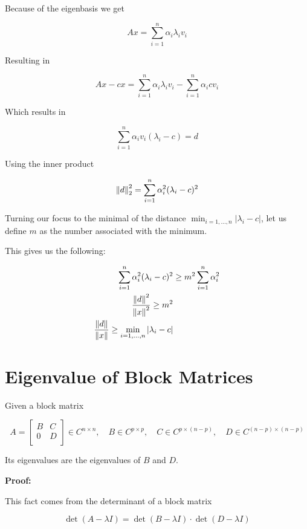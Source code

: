 Because of the eigenbasis we get 

\[
    Ax = \sum_{i = 1}^{n} \alpha_i \lambda_i v_i
\]

Resulting in 

\[
    Ax - cx = \sum_{i = 1}^{n} \alpha_i \lambda_i v_i - \sum_{i = 1}^{n} \alpha_i c v_i
\]

Which results in 

\[
    \sum_{i = 1}^{n} \alpha_i v_i (\lambda_i  - c) = d
\]

Using the inner product

\[
    \left\| d \right\|_2^2 = \sum_{i = 1}^{n} \alpha_i^2 (\lambda_i  - c)^2 
\]

Turning our focus to the minimal of the distance \(\min_{i = 1, \dots, n} |\lambda_i - c|\), let us 
define \(m\) as the number associated with the minimum.

This gives us the following:

\begin{align*}
    \sum_{i = 1}^{n} \alpha_i^2 (\lambda_i  - c)^2 &\ge m^2 \sum_{i = 1}^{n} \alpha_i^2 \\
    \frac{\left\| d \right\|^2}{\left\| x \right\|^2} \ge m^2 \\ 
    \frac{\left\| d \right\|}{\left\| x \right\|} \ge \min_{i = 1, \dots, n} |\lambda_i - c|
\end{align*}

\QED

\section{Eigenvalue of Block Matrices}

Given a block matrix

\[
    A = 
    \begin{bmatrix}
        B & C \\ 
        0 & D \\ 
    \end{bmatrix}
    \in C^{n \times n},
    \quad 
    B \in C^{p \times p},
    \quad
    C \in C^{p \times (n-p)},
    \quad
    D \in C^{(n-p) \times (n-p)}
\]

Its eigenvalues are the eigenvalues of \(B\) and \(D\).

\textbf{Proof:}

This fact comes from the determinant of a block matrix 

\[
    \det(A - \lambda I) = \det(B - \lambda I) \cdot \det(D - \lambda I)
\]

\QED

